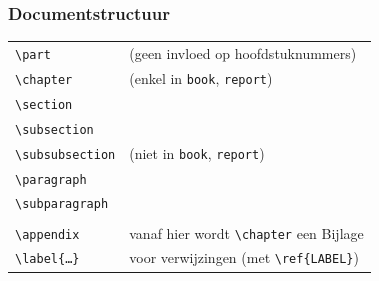 \documentclass[aspectratio=169]{beamer}
\begin{document}
\begin{frame}[fragile]
  \frametitle{Documentstructuur}
  
  \begin{center}
  \begin{tabular}{ll}
    \verb?\part? & (geen invloed op hoofdstuknummers) \\
    \verb?\chapter? & (enkel in \texttt{book}, \texttt{report}) \\
    \verb?\section? & \\
    \verb?\subsection? & \\
    \verb?\subsubsection? & (niet in \texttt{book}, \texttt{report}) \\ 
    \verb?\paragraph? & \\
    \verb?\subparagraph? & \\
    &\\
    \verb?\appendix? & vanaf hier wordt \verb?\chapter? een Bijlage \\
    \verb?\label{?\texttt{\ldots}\verb?}? & voor verwijzingen (met \verb|\ref{LABEL}|)
  \end{tabular}
  \end{center}
\end{frame}
\end{document}
